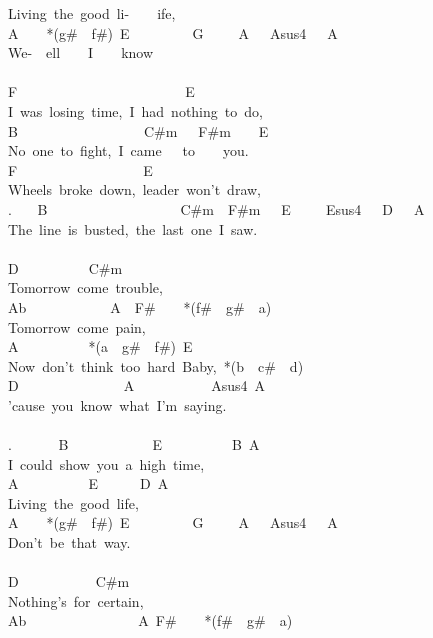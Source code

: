 {Living\ the\ good\ li-\ \ \ \ ife,\\
A\ \ \ \ *(g\#\ \ f\#)\ E\ \ \ \ \ \ \ \ \ G\ \ \ \ \ A\ \ \ Asus4\ \ \ A\\
We-\ \ ell\ \ \ \ I\ \ \ \ know\\
\\
F\ \ \ \ \ \ \ \ \ \ \ \ \ \ \ \ \ \ \ \ \ \ \ \ E\\
I\ was\ losing\ time,\ I\ had\ nothing\ to\ do,\\
B\ \ \ \ \ \ \ \ \ \ \ \ \ \ \ \ \ \ C\#m\ \ \ F\#m\ \ \ \ E\\
No\ one\ to\ fight,\ I\ came\ \ \ to\ \ \ \ you.\\
F\ \ \ \ \ \ \ \ \ \ \ \ \ \ \ \ \ \ E\\
Wheels\ broke\ down,\ leader\ won't\ draw,\\
. \ \ \ B\ \ \ \ \ \ \ \ \ \ \ \ \ \ \ \ \ \ \ C\#m\ \ F\#m\ \ \ E\ \ \ \ \ Esus4\ \ \ D\ \ \ A\\
The\ line\ is\ busted,\ the\ last\ one\ I\ saw.\\
\\
D\ \ \ \ \ \ \ \ \ \ C\#m\\
Tomorrow\ come\ trouble,\\
Ab\ \ \ \ \ \ \ \ \ \ \ \ A\ \ F\#\ \ \ \ *(f\#\ \ g\#\ \ a)\ \\
Tomorrow\ come\ pain,\\
A\ \ \ \ \ \ \ \ \ \ *(a\ \ g\#\ \ f\#)\ E\ \ \ \ \ \ \\
Now\ don't\ think\ too\ hard\ Baby,\ *(b\ \ c\#\ \ d)\\
D\ \ \ \ \ \ \ \ \ \ \ \ \ \ \ A\ \ \ \ \ \ \ \ \ \ \ Asus4\ A\\
'cause\ you\ know\ what\ I'm\ saying.\\
\\
. \ \ \ \ \ \ B\ \ \ \ \ \ \ \ \ \ \ \ E\ \ \ \ \ \ \ \ \ \ B\ A\\
I\ could\ show\ you\ a\ high\ time,\\
A\ \ \ \ \ \ \ \ \ \ E\ \ \ \ \ \ D\ A\\
Living\ the\ good\ life,\\
A\ \ \ \ *(g\#\ \ f\#)\ E\ \ \ \ \ \ \ \ \ G\ \ \ \ \ A\ \ \ Asus4\ \ \ A\\
Don't\ be\ that\ way.\\
\\
D\ \ \ \ \ \ \ \ \ \ \ C\#m\\
Nothing's\ for\ certain,\\
Ab\ \ \ \ \ \ \ \ \ \ \ \ \ \ \ \ A\ F\#\ \ \ \ *(f\#\ \ g\#\ \ a)\\
}
